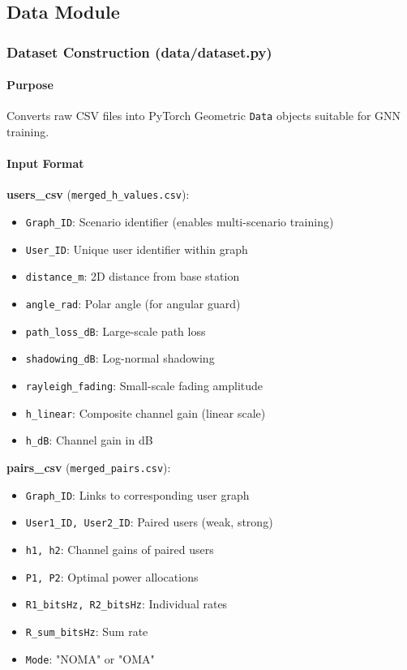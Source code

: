 \documentclass[12pt,a4paper]{article}
\begin{document}
\subsection{Data Module}

\subsubsection{Dataset Construction (data/dataset.py)}

\paragraph{Purpose}
Converts raw CSV files into PyTorch Geometric \texttt{Data} objects suitable for GNN training.

\paragraph{Input Format}
\textbf{users\_csv} (\texttt{merged\_h\_values.csv}):
\begin{itemize}
    \item \texttt{Graph\_ID}: Scenario identifier (enables multi-scenario training)
    \item \texttt{User\_ID}: Unique user identifier within graph
    \item \texttt{distance\_m}: 2D distance from base station
    \item \texttt{angle\_rad}: Polar angle (for angular guard)
    \item \texttt{path\_loss\_dB}: Large-scale path loss
    \item \texttt{shadowing\_dB}: Log-normal shadowing
    \item \texttt{rayleigh\_fading}: Small-scale fading amplitude
    \item \texttt{h\_linear}: Composite channel gain (linear scale)
    \item \texttt{h\_dB}: Channel gain in dB
\end{itemize}

\textbf{pairs\_csv} (\texttt{merged\_pairs.csv}):
\begin{itemize}
    \item \texttt{Graph\_ID}: Links to corresponding user graph
    \item \texttt{User1\_ID, User2\_ID}: Paired users (weak, strong)
    \item \texttt{h1, h2}: Channel gains of paired users
    \item \texttt{P1, P2}: Optimal power allocations
    \item \texttt{R1\_bitsHz, R2\_bitsHz}: Individual rates
    \item \texttt{R\_sum\_bitsHz}: Sum rate
    \item \texttt{Mode}: "NOMA" or "OMA"
\end{itemize}
\end{document}

